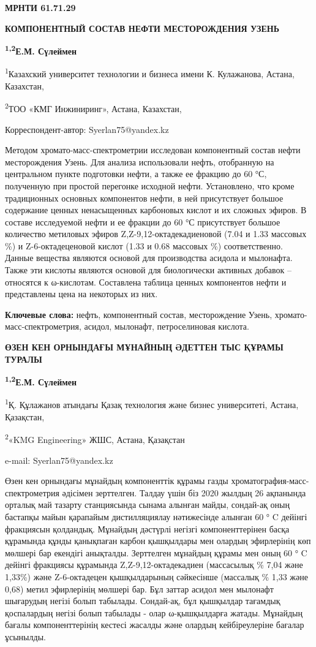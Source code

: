 

\newpage
{\bfseries МРНТИ 61.71.29}

{\bfseries КОМПОНЕНТНЫЙ СОСТАВ НЕФТИ МЕСТОРОЖДЕНИЯ УЗЕНЬ}

{\bfseries \textsuperscript{1,2}Е.М. Сүлеймен}

\textsuperscript{1}Казахский университет технологии и бизнеса имени К.
Кулажанова, Астана, Казахстан,

\textsuperscript{2}ТОО «КМГ Инжиниринг», Астана, Казахстан,

Корреспондент-автор: Syerlan75@yandex.kz

Методом хромато-масс-спектрометрии исследован компонентный состав нефти
месторождения Узень. Для анализа использовали нефть, отобранную на
центральном пункте подготовки нефти, а также ее фракцию до 60 °С,
полученную при простой перегонке исходной нефти. Установлено, что кроме
традиционных основных компонентов нефти, в ней присутствует большое
содержание ценных ненасыщенных карбоновых кислот и их сложных эфиров. В
составе исследуемой нефти и ее фракции до 60 °С присутствует большое
количество метиловых эфиров Z,Z-9,12-октадекадиеновой (7.04 и 1.33
массовых \%) и Z-6-октадеценовой кислот (1.33 и 0.68 массовых \%)
соответственно. Данные вещества являются основой для производства
асидола и мылонафта. Также эти кислоты являются основой для биологически
активных добавок -- относятся к ω-кислотам. Составлена таблица ценных
компонентов нефти и представлены цена на некоторых из них.

{\bfseries Ключевые слова:} нефть, компонентный состав, месторождение
Узень, хромато-масс-спектрометрия, асидол, мылонафт, петроселиновая
кислота.

{\bfseries ӨЗЕН КЕН ОРНЫНДАҒЫ МҰНАЙНЫҢ ӘДЕТТЕН ТЫС ҚҰРАМЫ ТУРАЛЫ}

{\bfseries \textsuperscript{1,2}Е.М. Сүлеймен}

\textsuperscript{1}Қ. Құлажанов атындағы Қазақ технология және бизнес
университеті, Астана, Қазақстан,

\textsuperscript{2}«KMG Engineering» ЖШС, Астана, Қазақстан

e-mail: Syerlan75@yandex.kz

Өзен кен орнындағы мұнайдың компоненттік құрамы газды
хроматография-масс-спектрометрия әдісімен зерттелген. Талдау үшін біз
2020 жылдың 26 ақпанында орталық май тазарту станциясында сынама алынған
майды, сондай-ақ оның бастапқы майын қарапайым дистилляциялау
нәтижесінде алынған 60 ° C дейінгі фракциясын қолдандық. Мұнайдың
дәстүрлі негізгі компоненттерінен басқа құрамында құнды қанықпаған
карбон қышқылдары мен олардың эфирлерінің көп мөлшері бар екендігі
анықталды. Зерттелген мұнайдың құрамы мен оның 60 ° C дейінгі фракциясы
құрамында Z,Z-9,12-октадекадиен (массасылық \% 7,04 және 1,33\%) және
Z-6-октадецен қышқылдарының сәйкесінше (массалық \% 1,33 және 0,68)
метил эфирлерінің мөлшері бар. Бұл заттар асидол мен мылонафт шығарудың
негізі болып табылады. Сондай-ақ, бұл қышқылдар тағамдық қоспалардың
негізі болып табылады - олар ω-қышқылдарға жатады. Мұнайдың бағалы
компоненттерінің кестесі жасалды және олардың кейбіреулеріне бағалар
ұсынылды.

